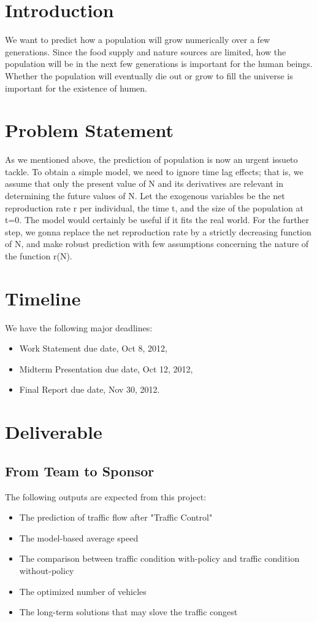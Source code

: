 \documentclass[12pt,letterpaper]{article}
\theoremstyle{definition}
\begin{document}
\section{Introduction} 
We want to predict how a population will grow numerically over a few generations. Since the food supply and nature sources are limited, how the population will be in the next few generations is important for the human beings. Whether the population will eventually die out or grow to fill the universe is important for the existence of humen.

\section{Problem Statement}
As we mentioned above, the prediction of population is now an urgent issueto tackle. To obtain a simple model, we need to ignore time lag effects; that is, we assume that only the present value of N and its derivatives are relevant in determining the future values of N. Let the exogenous variables be the net reproduction rate r per individual, the time t, and the size of the population at t=0. The model would certainly be useful if it fits the real world. For the further step, we gonna replace the net reproduction rate by a strictly decreasing function of N, and make robust prediction with few assumptions concerning the nature of the function r(N).  
  
\section{Timeline}
We have the following major deadlines:
\begin{itemize}
    \item Work Statement due date, Oct 8, 2012,
    \item Midterm Presentation due date, Oct 12, 2012,
    \item Final Report due date, Nov 30, 2012.
\end{itemize}

\section{Deliverable}
\subsection{From Team to Sponsor} %
The following outputs are expected from this project:
\begin{itemize}
    \item The prediction of traffic flow after "Traffic Control" 
    \item The model-based average speed
    \item The comparison between traffic condition with-policy and traffic condition without-policy
    \item The optimized number of vehicles 
    \item The long-term solutions that may slove the traffic congest
\end{itemize}
\end{document}
